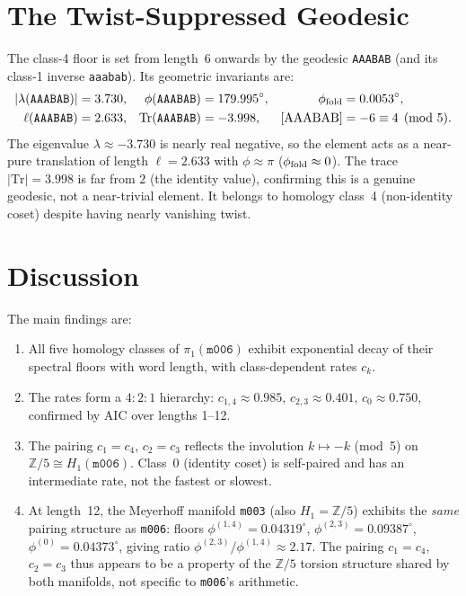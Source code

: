 \documentclass[12pt,a4paper]{article}
\newcommand{\mfld}[1]{\texttt{#1}}
\newcommand{\word}[1]{\texttt{#1}}
\newcommand{\degr}{^{\circ}}
\begin{document}
\section{The Twist-Suppressed Geodesic}
\label{sec:aaabab}

The class-4 floor is set from length~6 onwards by the geodesic
\word{AAABAB} (and its class-1 inverse \word{aaabab}).
Its geometric invariants are:
\begin{align}
  |\lambda(\word{AAABAB})| &= 3.730, &
  \phi(\word{AAABAB}) &= 179.995\degr, &
  \phi_{\rm fold} &= 0.0053\degr, \notag\\
  \ell(\word{AAABAB}) &= 2.633, &
  \mathrm{Tr}(\word{AAABAB}) &= -3.998, &
  [{\rm AAABAB}] &= -6\equiv 4\pmod{5}. \notag
\end{align}
The eigenvalue $\lambda\approx -3.730$ is nearly real negative, so the
element acts as a near-pure translation of length $\ell=2.633$ with
$\phi\approx\pi$ ($\phi_{\rm fold}\approx 0$).
The trace $|\mathrm{Tr}|=3.998$ is far from $2$ (the identity value),
confirming this is a genuine geodesic, not a near-trivial element.
It belongs to homology class~4 (non-identity coset) despite having
nearly vanishing twist.

\section{Discussion}
\label{sec:discussion}

The main findings are:
\begin{enumerate}
\item All five homology classes of $\pi_1(\mfld{m006})$ exhibit
      exponential decay of their spectral floors with word length,
      with class-dependent rates $c_k$.

\item The rates form a $4:2:1$ hierarchy: $c_{1,4}\approx 0.985$,
      $c_{2,3}\approx 0.401$, $c_0\approx 0.750$, confirmed by AIC
      over lengths 1--12.

\item The pairing $c_1=c_4$, $c_2=c_3$ reflects the involution
      $k\mapsto -k$ (mod~5) on $\mathbb{Z}/5\cong H_1(\mfld{m006})$.
      Class~0 (identity coset) is self-paired and has an intermediate
      rate, not the fastest or slowest.

\item At length~12, the Meyerhoff manifold \mfld{m003} (also $H_1=\mathbb{Z}/5$)
      exhibits the \emph{same} pairing structure as \mfld{m006}:
      floors $\phi^{(1,4)}=0.04319\degr$, $\phi^{(2,3)}=0.09387\degr$,
      $\phi^{(0)}=0.04373\degr$, giving ratio
      $\phi^{(2,3)}/\phi^{(1,4)}\approx 2.17$.
      The pairing $c_1=c_4$, $c_2=c_3$ thus appears to be a property
      of the $\mathbb{Z}/5$ torsion structure shared by both manifolds,
      not specific to \mfld{m006}'s arithmetic.
\end{enumerate}
\end{document}

